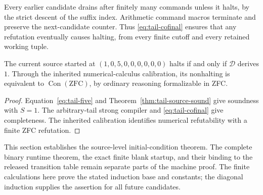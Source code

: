 Every earlier candidate drains after finitely many commands unless it
halts, by the strict descent of the suffix index. Arithmetic command
macros terminate and preserve the next-candidate counter. Thus
\eqref{eq:tail-cofinal} ensures that any refutation eventually causes
halting, from every finite cutoff and every retained working tuple.

\begin{corollary}
\label{cor:tail-seed-calibration}
The current source started at
$(1,0,5,0,0,0,0,0,0)$ halts if and only if $\mathcal D$ derives $1$.
Through the inherited numerical-calculus calibration, its nonhalting
is equivalent to $\operatorname{Con}(\mathrm{ZFC})$, by ordinary
reasoning formalizable in ZFC.
\end{corollary}

\begin{proof}
Equation~\eqref{eq:tail-five} and Theorem~\ref{thm:tail-source-sound}
give soundness with $S=1$. The arbitrary-tail strong compiler and
\eqref{eq:tail-cofinal} give completeness. The inherited calibration
identifies numerical refutability with a finite ZFC refutation.
\end{proof}

This section establishes the source-level initial-condition theorem.
The complete binary runtime theorem, the exact finite blank startup,
and their binding to the released transition table remain separate
parts of the machine proof. The finite calculations here prove the
stated induction base and constants; the diagonal induction supplies
the assertion for all future candidates.
